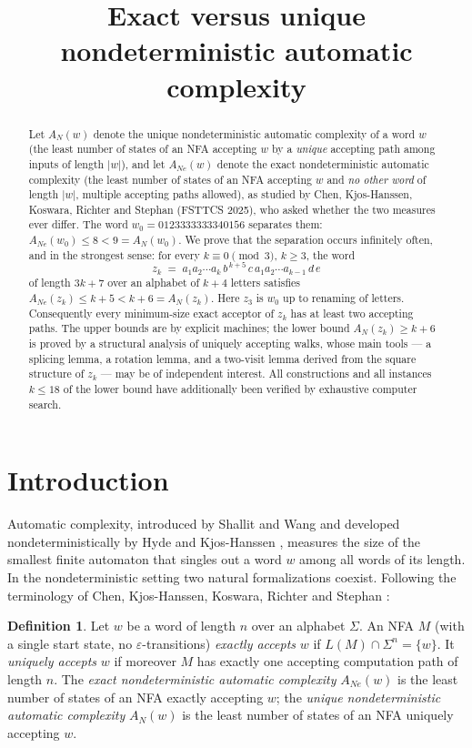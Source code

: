 \documentclass[11pt]{article}
\title{Exact versus unique nondeterministic automatic complexity}
\theoremstyle{definition}
\newtheorem{definition}[theorem]{Definition}
\newcommand{\AN}{A_N}
\newcommand{\ANe}{A_{Ne}}
\begin{document}
\maketitle

\begin{abstract}
Let $\AN(w)$ denote the unique nondeterministic automatic complexity of a word
$w$ (the least number of states of an NFA accepting $w$ by a \emph{unique}
accepting path among inputs of length $|w|$), and let $\ANe(w)$ denote the
exact nondeterministic automatic complexity (the least number of states of an
NFA accepting $w$ and \emph{no other word} of length $|w|$, multiple accepting
paths allowed), as studied by Chen, Kjos-Hanssen, Koswara, Richter and
Stephan (FSTTCS 2025), who asked whether the two measures ever differ.
The word
$w_0=0123333333340156$ separates them: $\ANe(w_0)\le 8<9=\AN(w_0)$. We prove that
the separation occurs infinitely often, and in the strongest sense: for every
$k\equiv 0 \pmod 3$, $k\ge 3$, the word
\[
z_k \;=\; a_1a_2\cdots a_k\, b^{\,k+5}\, c\, a_1a_2\cdots a_{k-1}\, d\,e
\]
of length $3k+7$ over an alphabet of $k+4$ letters satisfies
$\ANe(z_k)\le k+5 < k+6 = \AN(z_k)$. Here $z_3$ is $w_0$ up to renaming of
letters. Consequently every minimum-size exact acceptor of $z_k$ has at least
two accepting paths. The upper bounds are by explicit machines; the lower
bound $\AN(z_k)\ge k+6$ is proved by a structural analysis of uniquely
accepting walks, whose main tools --- a splicing lemma, a rotation lemma, and a
two-visit lemma derived from the square structure of $z_k$ --- may be of
independent interest. All constructions and all instances $k\le 18$ of the
lower bound have additionally been verified by exhaustive computer search.
\end{abstract}

\section{Introduction}

Automatic complexity, introduced by Shallit and Wang \cite{SW} and developed
nondeterministically by Hyde and Kjos-Hanssen \cite{HK}, measures the size of
the smallest finite automaton that singles out a word $w$ among all words of
its length. In the nondeterministic setting two natural formalizations
coexist. Following the terminology of Chen, Kjos-Hanssen, Koswara, Richter and
Stephan \cite{CKKRS}:

\begin{definition}\label{def:complexities}
Let $w$ be a word of length $n$ over an alphabet $\Sigma$. An NFA $M$
(with a single start state, no $\varepsilon$-transitions) \emph{exactly
accepts} $w$ if $L(M)\cap\Sigma^{n}=\{w\}$. It \emph{uniquely accepts} $w$ if
moreover $M$ has exactly one accepting computation path of length $n$.
The \emph{exact nondeterministic automatic complexity} $\ANe(w)$ is the least
number of states of an NFA exactly accepting $w$; the \emph{unique
nondeterministic automatic complexity} $\AN(w)$ is the least number of states
of an NFA uniquely accepting $w$.
\end{definition}
\end{document}
